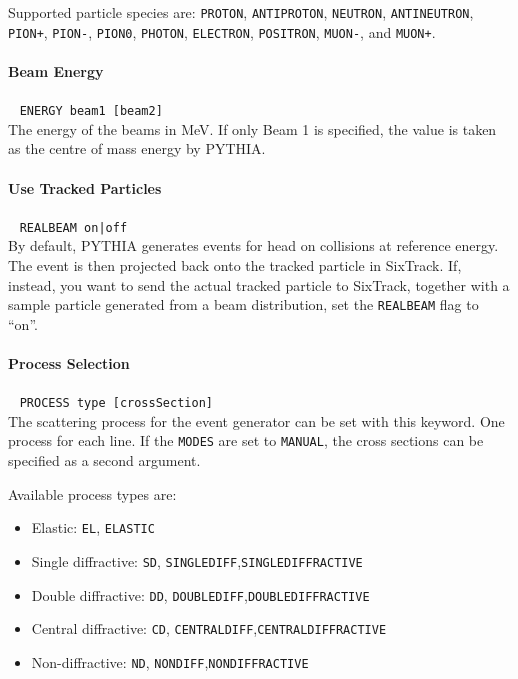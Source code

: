 Supported particle species are: \texttt{PROTON}, \texttt{ANTIPROTON}, \texttt{NEUTRON}, \texttt{ANTINEUTRON}, \texttt{PION+}, \texttt{PION-}, \texttt{PION0}, \texttt{PHOTON}, \texttt{ELECTRON}, \texttt{POSITRON}, \texttt{MUON-}, and \texttt{MUON+}.

\paragraph{Beam Energy}~ \texttt{ENERGY beam1 [beam2]}\\

The energy of the beams in MeV.
If only Beam 1 is specified, the value is taken as the centre of mass energy by PYTHIA.

\paragraph{Use Tracked Particles}~ \texttt{REALBEAM on|off}\\

By default, PYTHIA generates events for head on collisions at reference energy.
The event is then projected back onto the tracked particle in SixTrack.
If, instead, you want to send the actual tracked particle to SixTrack, together with a sample particle generated from a beam distribution, set the \texttt{REALBEAM} flag to ``on''.

\paragraph{Process Selection}~ \texttt{PROCESS type [crossSection]}\\

The scattering process for the event generator can be set with this keyword.
One process for each line.
If the \texttt{MODES} are set to \texttt{MANUAL}, the cross sections can be specified as a second argument.

\bigskip
\noindent Available process types are:
\begin{itemize}
  \item Elastic: \texttt{EL}, \texttt{ELASTIC}
  \item Single diffractive: \texttt{SD}, \texttt{SINGLEDIFF},\texttt{SINGLEDIFFRACTIVE}
  \item Double diffractive: \texttt{DD}, \texttt{DOUBLEDIFF},\texttt{DOUBLEDIFFRACTIVE}
  \item Central diffractive: \texttt{CD}, \texttt{CENTRALDIFF},\texttt{CENTRALDIFFRACTIVE}
  \item Non-diffractive: \texttt{ND}, \texttt{NONDIFF},\texttt{NONDIFFRACTIVE}
\end{itemize}

